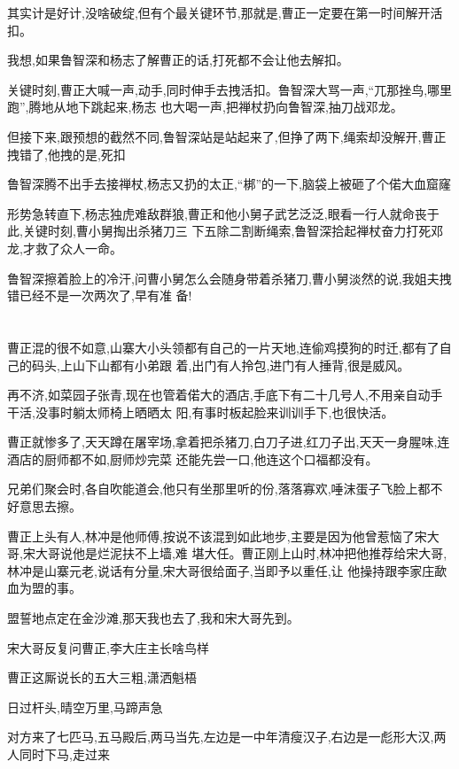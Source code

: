 ﻿\documentclass[12pt]{article}
\begin{document}
其实计是好计,没啥破绽,但有个最关键环节,那就是,曹正一定要在第一时间解开活扣。

我想,如果鲁智深和杨志了解曹正的话,打死都不会让他去解扣。

关键时刻,曹正大喊一声,动手,同时伸手去拽活扣。鲁智深大骂一声,``兀那挫鸟,哪里跑'',腾地从地下跳起来,杨志
也大喝一声,把禅杖扔向鲁智深,抽刀战邓龙。

但接下来,跟预想的截然不同,鲁智深站是站起来了,但挣了两下,绳索却没解开,曹正拽错了,他拽的是,死扣

鲁智深腾不出手去接禅杖,杨志又扔的太正,``梆''的一下,脑袋上被砸了个偌大血窟窿

形势急转直下,杨志独虎难敌群狼,曹正和他小舅子武艺泛泛,眼看一行人就命丧于此,关键时刻,曹小舅掏出杀猪刀三
下五除二割断绳索,鲁智深拾起禅杖奋力打死邓龙,才救了众人一命。

鲁智深擦着脸上的冷汗,问曹小舅怎么会随身带着杀猪刀,曹小舅淡然的说,我姐夫拽错已经不是一次两次了,早有准
备!

\section{}

曹正混的很不如意,山寨大小头领都有自己的一片天地,连偷鸡摸狗的时迁,都有了自己的码头,上山下山都有小弟跟
着,出门有人拎包,进门有人捶背,很是威风。

再不济,如菜园子张青,现在也管着偌大的酒店,手底下有二十几号人,不用亲自动手干活,没事时躺太师椅上晒晒太
阳,有事时板起脸来训训手下,也很快活。

曹正就惨多了,天天蹲在屠宰场,拿着把杀猪刀,白刀子进,红刀子出,天天一身腥味,连酒店的厨师都不如,厨师炒完菜
还能先尝一口,他连这个口福都没有。

兄弟们聚会时,各自吹能道会,他只有坐那里听的份,落落寡欢,唾沫蛋子飞脸上都不好意思去擦。

曹正上头有人,林冲是他师傅,按说不该混到如此地步,主要是因为他曾惹恼了宋大哥,宋大哥说他是烂泥扶不上墙,难
堪大任。曹正刚上山时,林冲把他推荐给宋大哥,林冲是山寨元老,说话有分量,宋大哥很给面子,当即予以重任,让
他操持跟李家庄歃血为盟的事。

盟誓地点定在金沙滩,那天我也去了,我和宋大哥先到。

宋大哥反复问曹正,李大庄主长啥鸟样\dldots

曹正这厮说长的五大三粗,潇洒魁梧\dldots

日过杆头,晴空万里,马蹄声急

对方来了七匹马,五马殿后,两马当先,左边是一中年清瘦汉子,右边是一彪形大汉,两人同时下马,走过来
\end{document}
